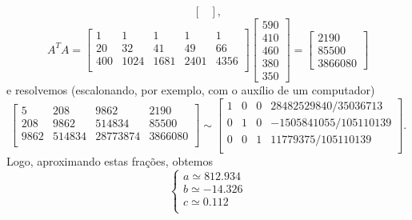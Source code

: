 \begin{ex}
\begin{equation}
\begin{bmatrix}
  \end{bmatrix},
  \end{equation}
  \begin{equation}
  A^T A =
  \begin{bmatrix}
    1 & 1 & 1 & 1 & 1 \\
    20 & 32 & 41 & 49 & 66 \\
    400 & 1024 & 1681 & 2401 & 4356 \\
  \end{bmatrix}
  \begin{bmatrix}
    590 \\ 410 \\ 460 \\ 380 \\ 350
  \end{bmatrix} =
  \begin{bmatrix}
    2190 \\ 85500 \\ 3866080
  \end{bmatrix}
  \end{equation} e resolvemos (escalonando, por exemplo, com o auxílio de um computador)
  \begin{equation}
  \begin{bmatrix}
    5 & 208 & 9862 & 2190 \\
    208 & 9862 & 514834 & 85500 \\
    9862 & 514834 & 28773874 & 3866080 \\
  \end{bmatrix} \sim
  \begin{bmatrix}
    1 & 0 & 0 & 28482529840/35036713 \\
    0 & 1 & 0 & -1505841055/105110139 \\
    0 & 0 & 1 & 11779375/105110139 \\
  \end{bmatrix}.
  \end{equation} 
  Logo, aproximando estas frações, obtemos
  \begin{equation}
  \left\{
    \begin{array}{ll}
      a \simeq 812.934 \\
      b \simeq -14.326 \\
      c \simeq  0.112 \\
    \end{array}
  \right.
  \end{equation} 
  \begin{figure}[h!]
  	\begin{center}

\end{center}
\end{figure}
\end{ex}
